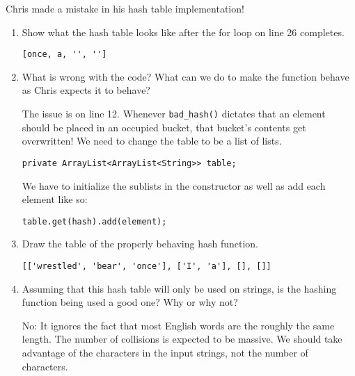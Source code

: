 %
%


Chris made a mistake in his hash table implementation!

    

    \begin{enumerate}
    \item Show what the hash table looks like after the for loop on line 26
          completes.

        \begin{answer}
		\begin{lstlisting}[numbers=none]
[once, a, '', '']
		\end{lstlisting}
        \end{answer}

    \item What is wrong with the code? What can we do to make the function behave as Chris expects it to behave?

        \begin{answer}
        The issue is on line 12. Whenever \texttt{bad\_hash()} dictates that an element should be placed in an occupied bucket, that bucket's contents get overwritten! 
	We need to change the table to be a list of lists.
\begin{lstlisting}[numbers=none]
private ArrayList<ArrayList<String>> table;
\end{lstlisting}
	We have to initialize the sublists in the constructor as well as add each element like so:
\begin{lstlisting}[numbers=none]
table.get(hash).add(element);
\end{lstlisting}

        \end{answer}

    \item Draw the table of the properly behaving hash function.

        \begin{answer}
		\begin{lstlisting}[numbers=none]
[['wrestled', 'bear', 'once'], ['I', 'a'], [], []]
		\end{lstlisting}
    \end{answer}
\item Assuming that this hash table will only be used on strings, is the hashing function being used a good one? Why or why not?

    \begin{answer}
        No: It ignores the fact that most English words are the roughly the same length. The number of collisions is expected to be massive. We should take advantage of the characters in the input strings, not the number of characters.
    \end{answer}
    \end{enumerate}
